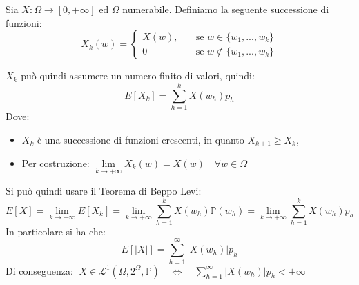 \begin{dimostrazione}
    Sia $X:\Omega\to[0, +\infty]$ ed $\Omega$ numerabile. Definiamo la seguente successione di funzioni:
    \[X_k(w) = \begin{cases}
        X(w), \quad & \text{se } w\in \{w_1, ..., w_k\}\\
        0 & \text{se } w\notin\{w_1, ..., w_k\}
    \end{cases}\]
\begin{figure}[H]
\centering
{}
\end{figure}
$X_k$ può quindi assumere un numero finito di valori, quindi:
\[E[X_k] = \sum_{h=1}^k X(w_h)p_h\]
Dove:
\begin{itemize}
    \item $X_k$ è una successione di funzioni crescenti, in quanto $X_{k+1} \geq X_k$, \item Per costruzione: $\underset{k\to+\infty}{\lim}X_k(w) = X(w)\quad \forall w\in \Omega$
\end{itemize}
Si può quindi usare il Teorema di Beppo Levi:
\[
    E[X] = \lim_{k\to+\infty}E[X_k] = \lim_{k\to+\infty}\sum_{h=1}^k X(w_h)\mathbb{P}(w_h) = \lim_{k\to+\infty}\sum_{h=1}^k X(w_h)p_h
\]
In particolare si ha che: 
\[E[|X|] = \sum_{h=1}^\infty \left|X(w_h)\right|p_h\]
Di conseguenza: $\;X\in \mathcal{L}^1(\Omega, 2^\Omega, \mathbb{P})\quad \iff\quad \sum_{h=1}^\infty \left|X(w_h)\right|p_h<+\infty$
\end{dimostrazione}

